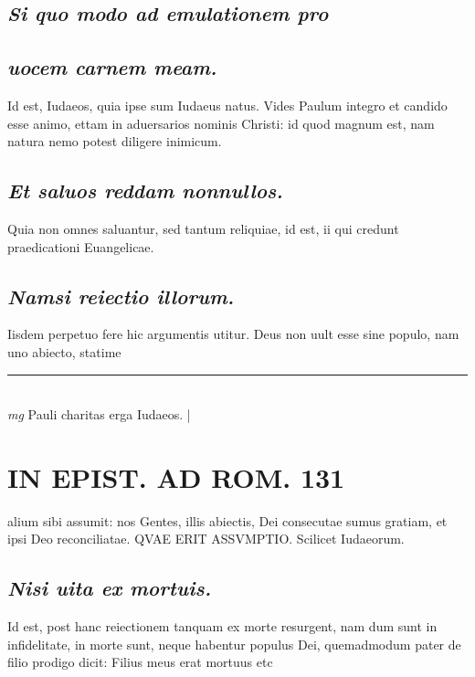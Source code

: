 \documentclass{article}
\begin{document}
\begin{pages}
\subsection*{\textit{Si quo modo ad emulationem pro }}
{}
\subsection*{\textit{uocem carnem meam. }}\pstart Id est, Iudaeos, quia ipse sum Iudaeus natus. Vides Paulum integro et candido esse animo, ettam in aduersarios nominis Christi: id quod magnum est, nam natura nemo potest diligere inimicum.   \pend
{}
{}
\subsection*{\textit{Et saluos reddam nonnullos. }}\pstart Quia non omnes saluantur, sed tantum reliquiae, id est, ii qui credunt praedicationi Euangelicae.  \pend
{}
{}
\subsection*{\textit{Namsi reiectio illorum. }}\pstart Iisdem perpetuo fere hic argumentis utitur. Deus non uult esse sine populo, nam uno abiecto, statime  \pend
\vspace{0.5cm}\noindent
\vspace{0.2cm}\rule{1cm}{0.2pt}\\ 
\hspace{0.2cm}\textit{mg}
\footnotesize Pauli charitas erga Iudaeos.  
\normalsize| 
\section*{IN EPIST. AD ROM.  131 }
\marginpar{[ p.]}\pstart alium sibi assumit: nos Gentes, illis abiectis, Dei consecutae sumus gratiam, et ipsi Deo reconciliatae. QVAE ERIT ASSVMPTIO. Scilicet Iudaeorum.   \pend
{}
{}
\subsection*{\textit{Nisi uita ex mortuis. }}\pstart Id est, post hanc reiectionem tanquam ex morte resurgent, nam dum sunt in infidelitate, in morte sunt, neque habentur populus Dei, quemadmodum pater de filio prodigo dicit: Filius meus erat mortuus etc\pend
{}
{}

\end{pages}
\end{document}

